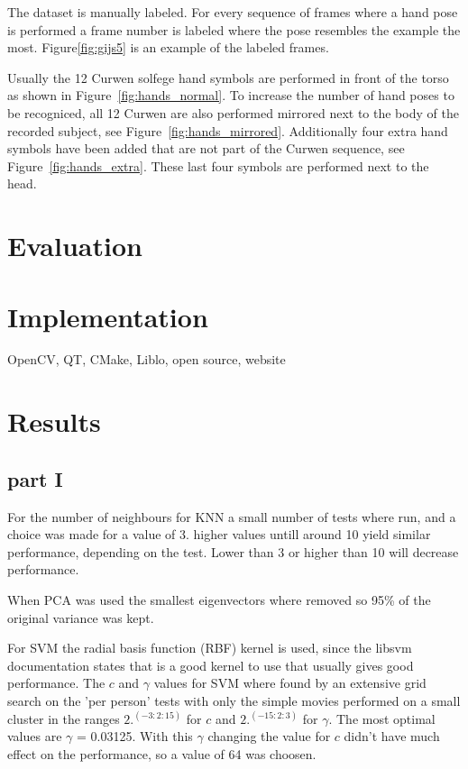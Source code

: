The dataset is manually labeled. For every sequence of frames where a hand pose is performed a frame number is labeled where the pose resembles the example the most. Figure\ref{fig:gijs5} is an example of the labeled frames.

Usually the 12 Curwen solfege hand symbols are performed in front of the torso as shown in Figure~\ref{fig:hands_normal}. To increase the number of hand poses to be recogniced, all 12 Curwen are also performed mirrored next to the body of the recorded subject, see Figure~\ref{fig:hands_mirrored}. Additionally four extra hand symbols have been added that are not part of the Curwen sequence, see Figure~\ref{fig:hands_extra}. These last four symbols are performed next to the head.

\section{Evaluation}


\section{Implementation}
OpenCV, QT, CMake, Liblo, open source, website

\section{Results}

\subsection{part I}
For the number of neighbours for KNN a small number of tests where run, and a choice was made for a value of 3. higher values untill around 10 yield similar performance, depending on the test. Lower than 3 or higher than 10 will decrease performance.

When PCA was used the smallest eigenvectors where removed so 95\% of the original variance was kept.

For SVM the radial basis function (RBF) kernel is used, since the libsvm documentation states that is a good kernel to use that usually gives good performance. The $c$ and $\gamma$ values for SVM where found by an extensive grid search on the 'per person' tests with only the simple movies performed on a small cluster in the ranges $2.^(-3:2:15)$ for $c$ and $2.^(-15:2:3)$ for $\gamma$. The most optimal values are $\gamma$ = 0.03125. With this $\gamma$ changing the value for $c$ didn't have much effect on the performance, so a value of 64 was choosen.

